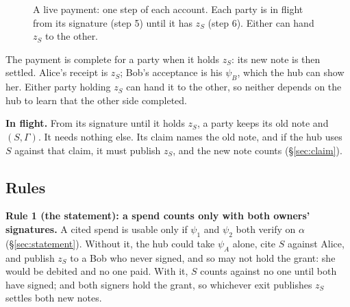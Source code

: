 \documentclass[11pt]{article}
\theoremstyle{plain}
\theoremstyle{definition}
\newcommand{\Compl}{\mathsf{Complete}}
\begin{document}
\begin{figure}[!tbp]
\caption{A live payment: one step of each account. Each party is in
flight from its signature (step 5) until it has $z_S$ (step 6). Either
can hand $z_S$ to the other.}
\label{fig:payment}
\end{figure}

The payment is complete for a party when it holds $z_S$: its new note
is then settled. Alice's receipt is $z_S$; Bob's acceptance is his
$\psi_B$, which the hub can show her. Either party holding $z_S$ can
hand it to the other, so neither depends on the hub to learn that the
other side completed.

\textbf{In flight.} From its signature until it holds $z_S$, a party
keeps its old note and $(S, \Gamma)$. It needs nothing else. Its claim
names the old note, and if the hub uses $S$ against that claim, it must
publish $z_S$, and the new note counts (\S\ref{sec:claim}).

\subsection{Rules}\label{sec:rules}

\textbf{Rule 1 (the statement): a spend counts only with both owners'
signatures.} A cited spend is usable only if $\psi_1$ and $\psi_2$ both
verify on $\alpha$ (\S\ref{sec:statement}). Without it, the hub could
take $\psi_A$ alone, cite $S$ against Alice, and publish $z_S$ to a Bob
who never signed, and so may not hold the grant: she would be debited
and no one paid. With it, $S$ counts against no one until both have
signed; and both signers hold the grant, so whichever exit publishes
$z_S$ settles both new notes.
\end{document}
